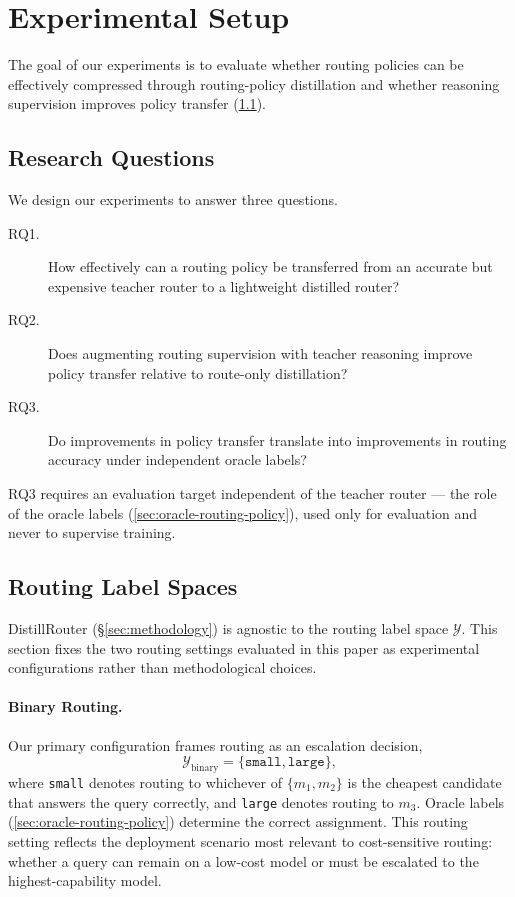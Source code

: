 \documentclass{article}
\begin{document}
\section{Experimental Setup}
\label{sec:experimental-setup}

The goal of our experiments is to evaluate whether routing policies can be effectively compressed through routing-policy distillation and whether reasoning supervision improves policy transfer (\ref{sec:research-questions}).

\subsection{Research Questions}
\label{sec:research-questions}

We design our experiments to answer three questions.
\begin{description}
  \item[RQ1.] How effectively can a routing policy be transferred from an accurate but expensive teacher router to a lightweight distilled router?
  \item[RQ2.] Does augmenting routing supervision with teacher reasoning improve policy transfer relative to route-only distillation?
  \item[RQ3.] Do improvements in policy transfer translate into improvements in routing accuracy under independent oracle labels?
\end{description}
RQ3 requires an evaluation target independent of the teacher router — the role of the oracle labels (\ref{sec:oracle-routing-policy}), used only for evaluation and never to supervise training.

\subsection{Routing Label Spaces}
\label{sec:routing-label-spaces}

DistillRouter (\S\ref{sec:methodology}) is agnostic to the routing label space $\mathcal{Y}$. This section fixes the two routing settings evaluated in this paper as experimental configurations rather than methodological choices.

\paragraph{Binary Routing.} Our primary configuration frames routing as an escalation decision,
\begin{equation}
  \mathcal{Y}_{\text{binary}} = \{\texttt{small}, \texttt{large}\},
\end{equation}
where \texttt{small} denotes routing to whichever of $\{m_1, m_2\}$ is the cheapest candidate that answers the query correctly, and \texttt{large} denotes routing to $m_3$. Oracle labels (\ref{sec:oracle-routing-policy}) determine the correct assignment. This routing setting reflects the deployment scenario most relevant to cost-sensitive routing: whether a query can remain on a low-cost model or must be escalated to the highest-capability model.
\end{document}
